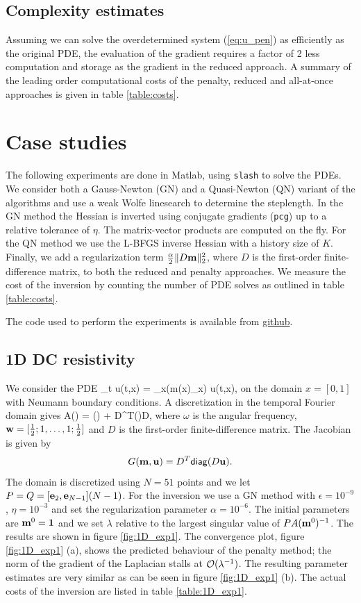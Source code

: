 \documentclass{iopart}
\begin{document}
\subsection{Complexity estimates}
Assuming we can solve the overdetermined system (\ref{eq:u_pen}) as efficiently as
the original PDE, the evaluation of the gradient requires a factor of 2 less
computation and storage as the gradient in the reduced approach. 
A summary of the leading order computational costs of the penalty, reduced and all-at-once approaches is given in table \ref{table:costs}.

\section{Case studies}
\label{examples}
The following experiments are done in Matlab, using \texttt{slash} to solve the PDEs. We consider both
a Gauss-Newton (GN) and a Quasi-Newton (QN) variant of the algorithms and use a weak Wolfe linesearch
to determine the steplength. In the GN method the Hessian is inverted using 
conjugate gradients (\texttt{pcg}) up to a relative tolerance of $\eta$. The matrix-vector products are computed on the fly.
For the QN method we use the L-BFGS inverse Hessian with a history size of $K$. Finally, we add a regularization term
$\frac{\alpha}{2} \|D\mathbf{m}\|_2^2$, where $D$ is the first-order finite-difference matrix,  to both the reduced and penalty approaches. 
We measure the cost of the inversion by counting the number of PDE solves as outlined in table \ref{table:costs}.

The code used to perform the experiments is available from \url{github}.

\subsection{1D DC resistivity}
We consider the PDE
\bq
\partial_t u(t,x) = \partial_x\left(m(x)\partial_x\right) u(t,x),
\eq
on the domain $x = [0,1]$ with Neumann boundary conditions. 
A discretization in the temporal Fourier domain gives
\bq
A() = \imath\omega{}() + D^T()D,
\eq
where $\omega$ is the angular frequency, $\mathbf{w} = [\frac{1}{2}; 1, \ldots, 1; \frac{1}{2}]$ and $D$ is the first-order finite-difference matrix. 
The Jacobian is given by 
\[G(\mathbf{m},\mathbf{u}) = D^T\mathsf{diag}(D\mathbf{u}).
\]
The domain is discretized using $N=51$ points and we let $P = Q = [\mathbf{e}_2, \mathbf{e}_{N-1}](N-1)$.
For the inversion we use a GN method with $\epsilon=10^{-9}$, $\eta=10^{-3}$ and set the regularization parameter $\alpha = 10^{-6}$.
The initial parameters are $\mathbf{m}^0 = \mathbf{1}$ and we set $\lambda$ relative to the largest singular value of $PA(\mathbf{m}^0)^{-1}$.
The results are shown in figure \ref{fig:1D_exp1}. The convergence plot, figure \ref{fig:1D_exp1} (a), shows the predicted behaviour of the penalty method; the norm
of the gradient of the Laplacian stalls at $\mathcal{O}(\lambda^{-1})$. The resulting parameter estimates are very similar as can be seen 
in figure \ref{fig:1D_exp1} (b). The actual costs of the inversion are listed in table \ref{table:1D_exp1}.
\end{document}
